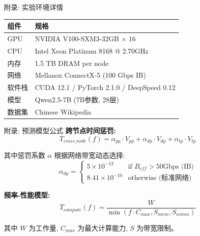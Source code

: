 \documentclass[aspectratio=169,10pt]{beamer}
\begin{document}
\begin{frame}{附录: 实验环境详情}
\begin{table}
\centering
\small
\begin{tabular}{ll}
\toprule
\textbf{组件} & \textbf{规格} \\
\midrule
GPU & NVIDIA V100-SXM3-32GB × 16 \\
CPU & Intel Xeon Platinum 8168 @ 2.70GHz \\
内存 & 1.5 TB DRAM per node \\
网络 & Mellanox ConnectX-5 (100 Gbps IB) \\
\midrule
软件栈 & CUDA 12.1 / PyTorch 2.1.0 / DeepSpeed 0.12 \\
模型 & Qwen2.5-7B (7B参数, 28层) \\
数据集 & Chinese Wikipedia \\
\bottomrule
\end{tabular}
\end{table}
\end{frame}

\begin{frame}{附录: 预测模型公式}
\textbf{跨节点时间惩罚:}
\[
T_{cross\_node}(f) = \alpha_{pp} \cdot V_{pp} + \alpha_{dp} \cdot V_{dp} + \alpha_{tp} \cdot V_{tp}
\]

其中惩罚系数 $\alpha$ 根据网络带宽动态选择:
\[
\alpha_{dp} = \begin{cases}
5 \times 10^{-13} & \text{if } B_{eff} > 50\text{Gbps (IB)} \\
8.41 \times 10^{-10} & \text{otherwise (标准网络)}
\end{cases}
\]
\vspace{0.3cm}

\textbf{频率-性能模型:}
\[
T_{compute}(f) = \frac{W}{\min(f \cdot C_{max}, S_{mem}, S_{comm})}
\]

其中 $W$ 为工作量, $C_{max}$ 为最大计算能力, $S$ 为带宽限制。
\end{frame}
\end{document}
